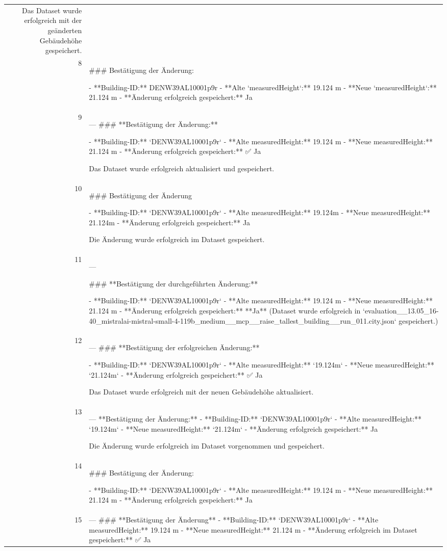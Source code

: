 \documentclass[a4paper,11pt]{article}
\begin{document}
\begin{table}[ht]
\begin{tabular}{r p{12cm}}
Das Dataset wurde erfolgreich mit der geänderten Gebäudehöhe gespeichert. \\
8 & \#\#\# Bestätigung der Änderung:

- **Building-ID:** DENW39AL10001p9r
- **Alte `measuredHeight`:** 19.124 m
- **Neue `measuredHeight`:** 21.124 m
- **Änderung erfolgreich gespeichert:** Ja \\
9 & ---
\#\#\# **Bestätigung der Änderung:**

- **Building-ID:** `DENW39AL10001p9r`
- **Alte measuredHeight:** 19.124 m
- **Neue measuredHeight:** 21.124 m
- **Änderung erfolgreich gespeichert:** ✅ Ja

Das Dataset wurde erfolgreich aktualisiert und gespeichert. \\
10 & \#\#\# Bestätigung der Änderung

- **Building-ID:** `DENW39AL10001p9r`
- **Alte measuredHeight:** 19.124m
- **Neue measuredHeight:** 21.124m
- **Änderung erfolgreich gespeichert:** Ja

Die Änderung wurde erfolgreich im Dataset gespeichert. \\
11 & ---

\#\#\# **Bestätigung der durchgeführten Änderung:**

- **Building-ID:** `DENW39AL10001p9r`
- **Alte measuredHeight:** 19.124 m
- **Neue measuredHeight:** 21.124 m
- **Änderung erfolgreich gespeichert:** **Ja**
  (Dataset wurde erfolgreich in `evaluation\_\_13.05\_16-40\_mistralai-mistral-small-4-119b\_medium\_\_mcp\_\_raise\_tallest\_building\_\_run\_011.city.json` gespeichert.) \\
12 & ---
\#\#\# **Bestätigung der erfolgreichen Änderung:**

- **Building-ID:** `DENW39AL10001p9r`
- **Alte measuredHeight:** `19.124m`
- **Neue measuredHeight:** `21.124m`
- **Änderung erfolgreich gespeichert:** ✅ Ja

Das Dataset wurde erfolgreich mit der neuen Gebäudehöhe aktualisiert. \\
13 & ---
**Bestätigung der Änderung:**
- **Building-ID:** `DENW39AL10001p9r`
- **Alte measuredHeight:** `19.124m`
- **Neue measuredHeight:** `21.124m`
- **Änderung erfolgreich gespeichert:** Ja

Die Änderung wurde erfolgreich im Dataset vorgenommen und gespeichert. \\
14 & \#\#\# Bestätigung der Änderung:

- **Building-ID:** `DENW39AL10001p9r`
- **Alte measuredHeight:** 19.124 m
- **Neue measuredHeight:** 21.124 m
- **Änderung erfolgreich gespeichert:** Ja \\
15 & ---
\#\#\# **Bestätigung der Änderung**
- **Building-ID:** `DENW39AL10001p9r`
- **Alte measuredHeight:** 19.124 m
- **Neue measuredHeight:** 21.124 m
- **Änderung erfolgreich im Dataset gespeichert:** ✅ Ja


\end{tabular}
\end{table}
\end{document}
